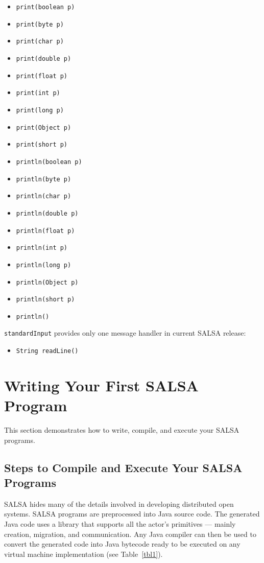 {\singlespace
\begin{itemize}
\item {\tt print(boolean p)}
\item {\tt print(byte p)}
\item {\tt print(char p)}
\item {\tt print(double p)}
\item {\tt print(float p)}
\item {\tt print(int p)}
\item {\tt print(long p)}
\item {\tt print(Object p)}
\item {\tt print(short p)}
\item {\tt println(boolean p)}
\item {\tt println(byte p)}
\item {\tt println(char p)}
\item {\tt println(double p)}
\item {\tt println(float p)}
\item {\tt println(int p)}
\item {\tt println(long p)}
\item {\tt println(Object p)}
\item {\tt println(short p)}
\item {\tt println()}
\end{itemize}
}
{\tt standardInput} provides only one message handler in current SALSA release:
{\singlespace
\begin{itemize}
\item {\tt String readLine()}
\end{itemize}
}

\section{Writing Your First SALSA Program}
\label{Writing Your First SALSA Program}
This section demonstrates how to write, compile, and 
execute your SALSA programs.

\subsection{Steps to Compile and Execute Your SALSA Programs}
\label{Steps to compile and execute your SALSA program}
SALSA hides many of the details involved in developing distributed 
open systems. SALSA programs are preprocessed into Java source code. 
The generated Java code uses a library that supports all the actor's 
primitives --- mainly creation, migration, and communication. Any Java 
compiler can then be used to convert the generated code into Java 
bytecode ready to be executed on any virtual machine 
implementation (see Table~\ref{tbl1}).
 
